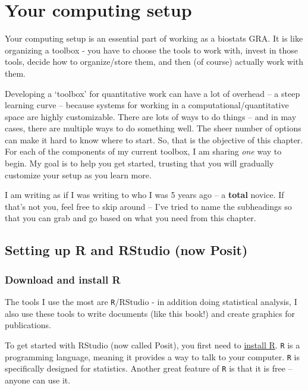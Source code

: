 \documentclass[
]{book}
\begin{document}
\hypertarget{your-computing-setup}{%
\chapter{Your computing setup}\label{your-computing-setup}}

Your computing setup is an essential part of working as a biostats GRA. It is like organizing a toolbox - you have to choose the tools to work with, invest in those tools, decide how to organize/store them, and then (of course) actually work with them.

Developing a `toolbox' for quantitative work can have a lot of overhead -- a steep learning curve -- because systems for working in a computational/quantitative space are highly customizable. There are lots of ways to do things -- and in may cases, there are multiple ways to do something well. The sheer number of options can make it hard to know where to start. So, that is the objective of this chapter. For each of the components of my current toolbox, I am sharing \emph{one} way to begin. My goal is to help you get started, trusting that you will gradually customize your setup as you learn more.

I am writing as if I was writing to who I was 5 years ago -- a \textbf{total} novice. If that's not you, feel free to skip around -- I've tried to name the subheadings so that you can grab and go based on what you need from this chapter.

\hypertarget{setting-up-r-and-rstudio-now-posit}{%
\section{Setting up R and RStudio (now Posit)}\label{setting-up-r-and-rstudio-now-posit}}

\hypertarget{download-and-install-r}{%
\subsection{Download and install R}\label{download-and-install-r}}

The tools I use the most are \texttt{R}/RStudio - in addition doing statistical analysis, I also use these tools to write documents (like this book!) and create graphics for publications.

To get started with RStudio (now called Posit), you first need to \href{https://www.r-project.org/}{install R}. \texttt{R} is a programming language, meaning it provides a way to talk to your computer. \texttt{R} is specifically designed for statistics. Another great feature of \texttt{R} is that it is free -- anyone can use it.
\end{document}
